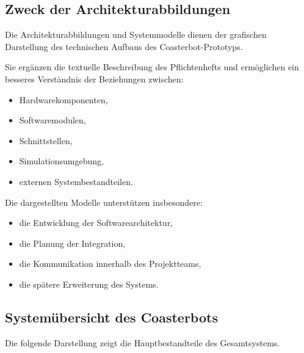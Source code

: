 \subsection{Zweck der
Architekturabbildungen}\label{zweck-der-architekturabbildungen}

Die Architekturabbildungen und Systemmodelle dienen der grafischen
Darstellung des technischen Aufbaus des Coasterbot-Prototyps.

Sie ergänzen die textuelle Beschreibung des Pflichtenhefts und
ermöglichen ein besseres Verständnis der Beziehungen zwischen:

\begin{itemize}
\tightlist
\item
  Hardwarekomponenten,
\item
  Softwaremodulen,
\item
  Schnittstellen,
\item
  Simulationsumgebung,
\item
  externen Systembestandteilen.
\end{itemize}

Die dargestellten Modelle unterstützen insbesondere:

\begin{itemize}
\tightlist
\item
  die Entwicklung der Softwarearchitektur,
\item
  die Planung der Integration,
\item
  die Kommunikation innerhalb des Projektteams,
\item
  die spätere Erweiterung des Systems.
\end{itemize}

\subsection{Systemübersicht des
Coasterbots}\label{systemuxfcbersicht-des-coasterbots}

Die folgende Darstellung zeigt die Hauptbestandteile des Gesamtsystems.


